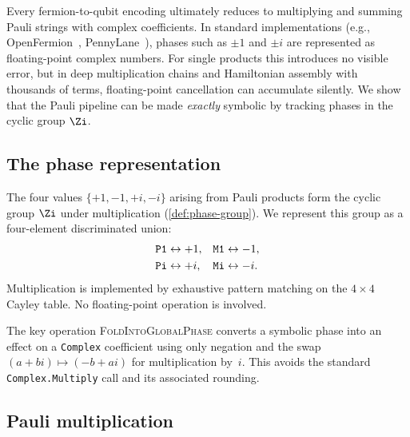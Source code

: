%

Every fermion-to-qubit encoding ultimately reduces to multiplying and
summing Pauli strings with complex coefficients.  In standard
implementations (e.g., OpenFermion~\cite{mcclean2020},
PennyLane~\cite{bergholm2022}), phases such as $\pm 1$ and $\pm i$
are represented as floating-point complex numbers.  For single products
this introduces no visible error, but in deep multiplication chains
and Hamiltonian assembly with thousands of terms, floating-point
cancellation can accumulate silently.  We show that the Pauli pipeline
can be made \emph{exactly} symbolic by tracking phases in the cyclic
group $\Zi$.

\subsection{The phase representation}
\label{sec:ex-phase}

The four values $\{+1, -1, +i, -i\}$ arising from Pauli products form
the cyclic group $\Zi$ under multiplication (\cref{def:phase-group}).  We
represent this group as a four-element discriminated union:
\begin{align}
  \texttt{P1} &\leftrightarrow +1, &
  \texttt{M1} &\leftrightarrow -1, \notag \\
  \texttt{Pi} &\leftrightarrow +i, &
  \texttt{Mi} &\leftrightarrow -i.
  \label{eq:phase-enum}
\end{align}
Multiplication is implemented by exhaustive pattern matching on the
$4 \times 4$ Cayley table.  No floating-point operation is involved.

The key operation \textsc{FoldIntoGlobalPhase} converts a symbolic
phase into an effect on a \texttt{Complex} coefficient using only
negation and the swap $(a + bi) \mapsto (-b + ai)$ for multiplication
by~$i$.  This avoids the standard \texttt{Complex.Multiply} call and
its associated rounding.

\subsection{Pauli multiplication}
\label{sec:ex-pauli}

